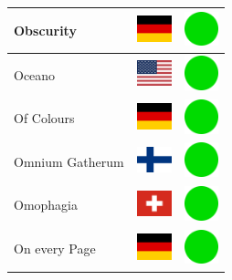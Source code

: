 \documentclass[12pt, a4paper, twoside]{report}
\begin{document}
\begin{center}
\begin{longtable}{|p{5cm}|p{2cm}|p{2cm}|}
Obscurity & \includegraphics[width=1cm]{4x3/de} & \includegraphics[width=1cm]{likes/y} \\ \hline
Oceano & \includegraphics[width=1cm]{4x3/us} & \includegraphics[width=1cm]{likes/y} \\ \hline
Of Colours & \includegraphics[width=1cm]{4x3/de} & \includegraphics[width=1cm]{likes/y} \\ \hline
Omnium Gatherum & \includegraphics[width=1cm]{4x3/fi} & \includegraphics[width=1cm]{likes/y} \\ \hline
Omophagia & \includegraphics[width=1cm]{4x3/ch} & \includegraphics[width=1cm]{likes/y} \\ \hline
On every Page & \includegraphics[width=1cm]{4x3/de} & \includegraphics[width=1cm]{likes/y} \\ \hline

\end{longtable}
\end{center}
\end{document}
